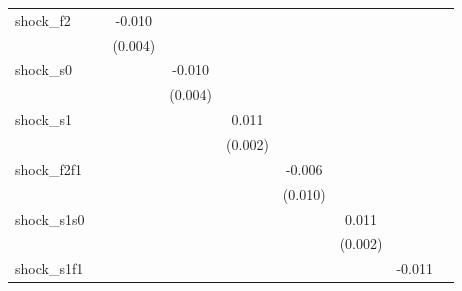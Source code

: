 {\begin{tabular}{l*{8}{c}}
\addlinespace
shock\_f2    &                     &      -0.010\sym{**} &                     &                     &                     &                     &                     &                     \\
            &                     &     (0.004)         &                     &                     &                     &                     &                     &                     \\
\addlinespace
shock\_s0    &                     &                     &      -0.010\sym{**} &                     &                     &                     &                     &                     \\
            &                     &                     &     (0.004)         &                     &                     &                     &                     &                     \\
\addlinespace
shock\_s1    &                     &                     &                     &       0.011\sym{***}&                     &                     &                     &                     \\
            &                     &                     &                     &     (0.002)         &                     &                     &                     &                     \\
\addlinespace
shock\_f2f1  &                     &                     &                     &                     &      -0.006         &                     &                     &                     \\
            &                     &                     &                     &                     &     (0.010)         &                     &                     &                     \\
\addlinespace
shock\_s1s0  &                     &                     &                     &                     &                     &       0.011\sym{***}&                     &                     \\
            &                     &                     &                     &                     &                     &     (0.002)         &                     &                     \\
\addlinespace
shock\_s1f1  &                     &                     &                     &                     &                     &                     &      -0.011         &                     \\

\end{tabular}}
